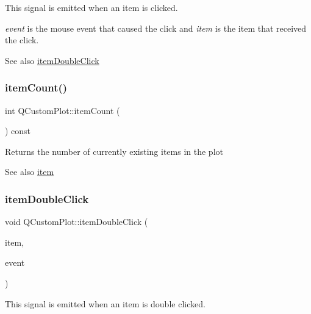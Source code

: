 This signal is emitted when an item is clicked.

{\itshape event} is the mouse event that caused the click and {\itshape item} is the item that received the click.

\begin{DoxySeeAlso}{See also}
\mbox{\hyperlink{class_q_custom_plot_ac83aa9f5a3e9bb3efc9cdc763dcd42a6}{item\+Double\+Click}} 
\end{DoxySeeAlso}
\mbox{\label{class_q_custom_plot_a16025daf0341f9362be3080e404424c2}} 
\subsubsection{\texorpdfstring{itemCount()}{itemCount()}}
{\footnotesize\ttfamily int Q\+Custom\+Plot\+::item\+Count (\begin{DoxyParamCaption}{ }\end{DoxyParamCaption}) const}

Returns the number of currently existing items in the plot

\begin{DoxySeeAlso}{See also}
\mbox{\hyperlink{class_q_custom_plot_ac042f2e78edd228ccf2f26b7fe215239}{item}} 
\end{DoxySeeAlso}
\mbox{\label{class_q_custom_plot_ac83aa9f5a3e9bb3efc9cdc763dcd42a6}} 
\subsubsection{\texorpdfstring{itemDoubleClick}{itemDoubleClick}}
{\footnotesize\ttfamily void Q\+Custom\+Plot\+::item\+Double\+Click (\begin{DoxyParamCaption}\item[{\mbox{\hyperlink{class_q_c_p_abstract_item}{Q\+C\+P\+Abstract\+Item}} $\ast$}]{item,  }\item[{Q\+Mouse\+Event $\ast$}]{event }\end{DoxyParamCaption})\hspace{0.3cm}{\ttfamily [signal]}}

This signal is emitted when an item is double clicked.

